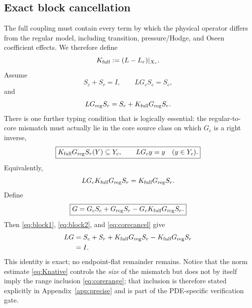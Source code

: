 \documentclass[11pt]{article}
\numberwithin{equation}{section}
\begin{document}
\subsection{Exact block cancellation}
The full coupling must contain every term by which the physical operator differs from the regular model, including transition, pressure/Hodge, and Oseen coefficient effects.  We therefore define
\begin{equation}
K_{\rm full}:=(L-L_r)|_{X_r}.
\label{eq:Kfull}
\end{equation}
Assume
\begin{equation}
S_c+S_r=I,
\qquad
LG_cS_c=S_c,
\label{eq:block1}
\end{equation}
and
\begin{equation}
LG_{\rm reg}S_r=S_r+K_{\rm full}G_{\rm reg}S_r.
\label{eq:block2}
\end{equation}
There is one further typing condition that is logically essential: the regular-to-core mismatch must actually lie in the core source class on which \(G_c\) is a right inverse,
\begin{equation}
\boxed{
K_{\rm full}G_{\rm reg}S_r(Y)\subseteq Y_c,
\qquad
LG_c y=y\quad(y\in Y_c).}
\label{eq:corerange}
\end{equation}
Equivalently,
\begin{equation}
LG_cK_{\rm full}G_{\rm reg}S_r
=K_{\rm full}G_{\rm reg}S_r.
\label{eq:corecancel}
\end{equation}
Define
\begin{equation}
\boxed{
G=G_cS_c+G_{\rm reg}S_r-G_cK_{\rm full}G_{\rm reg}S_r.}
\label{eq:Gglobal}
\end{equation}
Then \eqref{eq:block1}, \eqref{eq:block2}, and \eqref{eq:corecancel} give
\begin{align}
LG
&=S_c+S_r+K_{\rm full}G_{\rm reg}S_r-K_{\rm full}G_{\rm reg}S_r\notag\\
&=I.
\label{eq:LGI}
\end{align}
This identity is exact; no endpoint-flat remainder remains.  Notice that the norm estimate \eqref{eq:Knative} controls the \emph{size} of the mismatch but does not by itself imply the range inclusion \eqref{eq:corerange}; that inclusion is therefore stated explicitly in Appendix~\ref{app:precise} and is part of the PDE-specific verification gate.
\end{document}
